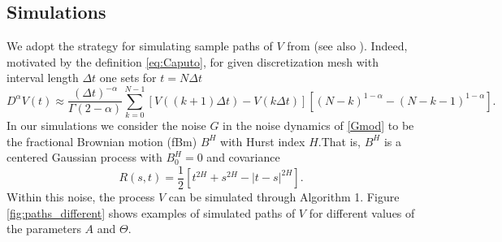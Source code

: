 \documentclass[11pt,reqno,oneside, a4paper]{amsart}
\numberwithin{equation}{section}
\theoremstyle{remark}
\begin{document}
\subsection{Simulations}
\label{sec:simu}
We adopt the strategy for simulating sample paths of $V$ from \cite[Section 3]{Pirozzi2018} (see also \cite[Section 6]{LeonenkoPirozzi2025}). Indeed, motivated by the definition \eqref{eq:Caputo}, for given discretization mesh with interval length $\Delta t$ one sets for $t=N \Delta t$ 
\begin{equation}\label{approxCaputo}
	D^\alpha V(t) \approx \frac{(\Delta t) ^{-\alpha}}{\Gamma(2-\alpha)} \sum_{k=0}^{N-1}[V((k+1)\Delta t)-V(k\Delta t)][(N-k)^{1-\alpha}-(N-k-1)^{1-\alpha}].
\end{equation}
In our simulations we consider the noise $G$ in the noise dynamics of \eqref{Gmod} to be the fractional Brownian motion (fBm) $B^H$ with Hurst index $H$.That is, $B^H$ is a centered Gaussian process with $B^H_0=0$ and covariance 
$$
R(s,t) = \frac{1}{2}\left[t^{2H} + s^{2H} - |t-s|^{2H}\right].
$$
Within this noise, the process $V$ can be simulated through Algorithm 1. Figure \ref{fig:paths_different} shows examples of simulated paths of $V$ for different values of the parameters $A$ and $\Theta$.
\end{document}
